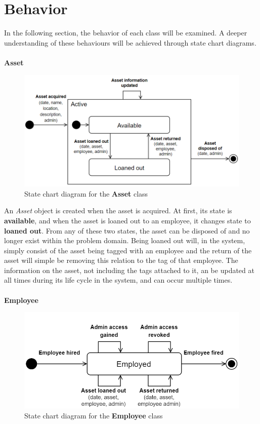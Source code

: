 \section{Behavior} \label{sc:behavoir}
In the following section, the behavior of each class will be examined. A deeper understanding of these behaviours will be achieved through state chart diagrams.
\\\\

\large{\textbf{Asset}}
\begin{figure}[H]
    \centering
    \includegraphics[width=1\textwidth]{figures/StateCharts/Asset_state_chart.png}
    \caption{State chart diagram for the \textbf{Asset} class}
    \label{fig:asset_statechart}
\end{figure}

An \textit{Asset} object is created when the asset is acquired. At first, its state is \textbf{available}, and when the asset is loaned out to an employee, it changes state to \textbf{loaned out}. From any of these two states, the asset can be disposed of and no longer exist within the problem domain. Being loaned out will, in the system, simply consist of the asset being tagged with an employee and the return of the asset will simple be removing this relation to the tag of that employee. The information on the asset, not including the tags attached to it, an be updated at all times during its life cycle in the system, and can occur multiple times.
\\\\

\large{\textbf{Employee}}
\begin{figure}[H]
    \centering
    \includegraphics[width=1\textwidth]{figures/StateCharts/StateChart_Employee.png}
    \caption{State chart diagram for the \textbf{Employee} class}
    \label{fig:employee_statechart}
\end{figure}

